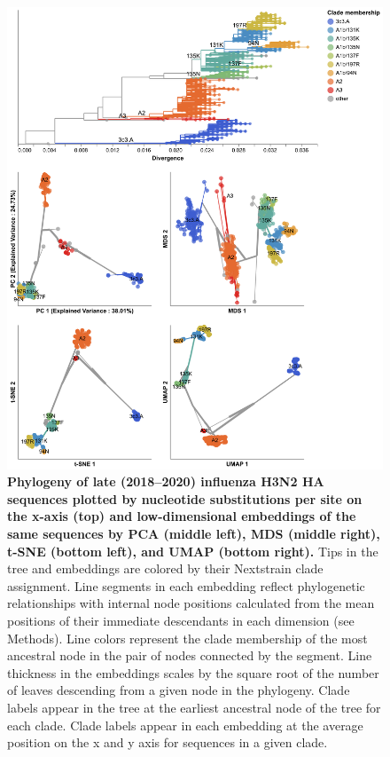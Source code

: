 \begin{figure}[!h]
\includegraphics[width=\columnwidth]{figures/flu-2018-2020-ha-embeddings-by-clade.png}
\caption{{\bf Phylogeny of late (2018--2020) influenza H3N2 HA sequences plotted by nucleotide substitutions per site on the x-axis (top) and low-dimensional embeddings of the same sequences by PCA (middle left), MDS (middle right), t-SNE (bottom left), and UMAP (bottom right).}
Tips in the tree and embeddings are colored by their Nextstrain clade assignment.
Line segments in each embedding reflect phylogenetic relationships with internal node positions calculated from the mean positions of their immediate descendants in each dimension (see Methods).
Line colors represent the clade membership of the most ancestral node in the pair of nodes connected by the segment.
Line thickness in the embeddings scales by the square root of the number of leaves descending from a given node in the phylogeny.
Clade labels appear in the tree at the earliest ancestral node of the tree for each clade.
Clade labels appear in each embedding at the average position on the x and y axis for sequences in a given clade.}\label{S_Fig_late_flu_embeddings_by_clade}
\end{figure}

